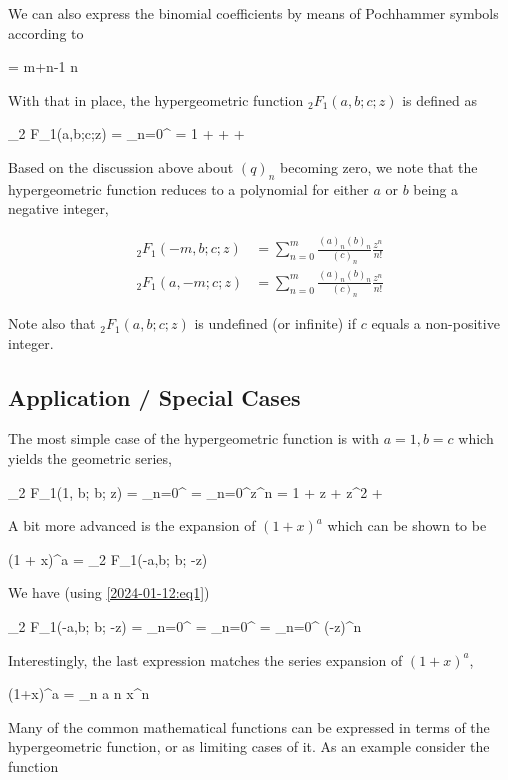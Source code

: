 We can also express the binomial coefficients by means of Pochhammer symbols according to

\be
\label{2024-01-12:eq2}
 = {m+n-1 \choose n}
\ee

With that in place, the hypergeometric function $_2 F_1(a,b;c;z)$ is defined as

\bee
_2 F_1(a,b;c;z) = \sum_{n=0}^\infty {}  = 1 +   +   + \cdots
\eee

Based on the discussion above about $(q)_n$ becoming zero, we note that the hypergeometric function reduces to a polynomial for either $a$ or $b$ being a negative integer,

\begin{align*}
_2 F_1(-m,b;c;z) &= \sum_{n=0}^m \frac{(a)_n (b)_n}{(c)_n} \frac{z^n}{n!} \\
_2 F_1(a,-m;c;z) &= \sum_{n=0}^m \frac{(a)_n (b)_n}{(c)_n} \frac{z^n}{n!}
\end{align*}

Note also that $_2 F_1(a,b;c;z)$ is undefined (or infinite) if $c$ equals a non-positive integer.

\subsection{Application / Special Cases}

The most simple case of the hypergeometric function is with $a = 1, b = c$ which yields the geometric series,

\bee
_2 F_1(1, b; b; z) = \sum_{n=0}^\infty {}  = \sum_{n=0}^\infty z^n = 1 + z + z^2 + \cdots
\eee

A bit more advanced is the expansion of $(1 + x)^a$ which can be shown to be

\bee
(1 + x)^a = _2 F_1(-a,b; b; -z)
\eee

We have (using \eqref{2024-01-12:eq1})

\bee
_2 F_1(-a,b; b; -z) = \sum_{n=0}^\infty {}  = \sum_{n=0}^\infty {} = \sum_{n=0}^ (-z)^n
\eee

Interestingly, the last expression matches the series expansion of $(1+x)^a$,

\bee
(1+x)^a = \sum_n {a \choose n} x^n
\eee

Many of the common mathematical functions can be expressed in terms of the hypergeometric function, or as limiting cases of it. As an example consider the function

